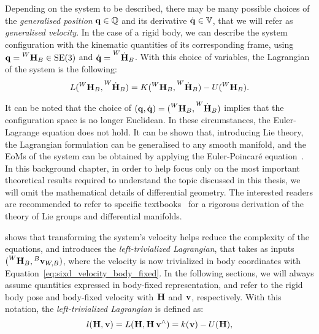 Depending on the system to be described, there may be many possible choices of the \emph{generalised position} $\Qu \in \mathbb{Q}$ and its derivative $\Qud \in \mathbb{V}$, that we will refer as \emph{generalised velocity}.
In the case of a rigid body, we can describe the system configuration with the kinematic quantities of its corresponding frame, \ie using $\Qu = \homo[W]_B \in \SE(3)$ and $\Qud = \homod[W]_B$.
With this choice of variables, the Lagrangian of the system is the following:
%
\begin{equation*}
    L(\homo[W]_B, \homod[W]_B) = K(\homo[W]_B, \homod[W]_B) - U(\homo[W]_B).
\end{equation*}

\begin{remark*}
%
It can be noted that the choice of $(\Qu, \Qud) = (\homo[W]_B, \homod[W]_B)$ implies that the configuration space is no longer Euclidean.
In these circumstances, the Euler-Lagrange equation does not hold.
It can be shown that, introducing Lie theory, the Lagrangian formulation can be generalised to any smooth manifold, and the \acp{EoM} of the system can be obtained by applying the Euler-Poincaré equation~\parencite{marsden_jerrold_e_introduction_2010, maruskin_dynamical_2018}.
In this background chapter, in order to help focus only on the most important theoretical results required to understand the topic discussed in this thesis, we will omit the mathematical details of differential geometry.
The interested readers are recommended to refer to specific textbooks~\parencite{warner_foundations_1983, selig_geometric_2005} for a rigorous derivation of the theory of Lie groups and differential manifolds.
%
\end{remark*}
%
\textcite{traversaro_modelling_2017} shows that transforming the system's velocity helps reduce the complexity of the equations, and introduces the \emph{left-trivialized Lagrangian}, that takes as inputs $(\homo[W]_B, \velsix[B]_{W,B})$, where the velocity is now trivialized in body coordinates with Equation~\eqref{eq:sixd_velocity_body_fixed}.
In the following sections, we will always assume quantities expressed in body-fixed representation, and refer to the rigid body pose and body-fixed velocity with $\homo$ and $\velsix$, respectively.
With this notation, the \emph{left-trivialized Lagrangian} is defined as:
%
\begin{equation}
    \label{eq:left_trivialized_lagrangian}
    l(\homo, \velsix) = L(\homo, \homo \velsix^\wedge) = k(\velsix) - U(\homo)
    ,
\end{equation}

